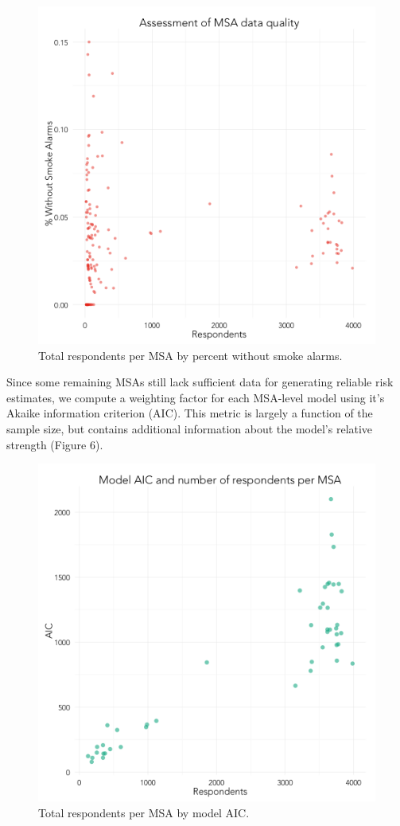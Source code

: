 \documentclass{sig-alternate}
\begin{document}
\begin{figure}
\centering 
\includegraphics[scale=0.42]{compute-msa-stats-scatter-1.png}
\caption{Total respondents per MSA by percent without smoke alarms.}
\end{figure}

Since some remaining MSAs still lack sufficient data for generating reliable risk estimates, we compute a weighting factor for each MSA-level model using it's Akaike information criterion (AIC). This metric is largely a function of the sample size, but contains additional information about the model's relative strength (Figure 6).

\begin{figure}
\centering 
\includegraphics[scale=0.42]{estimate-msas-compare-aic-1.png}
\caption{Total respondents per MSA by model AIC.}
\end{figure}
\end{document}
